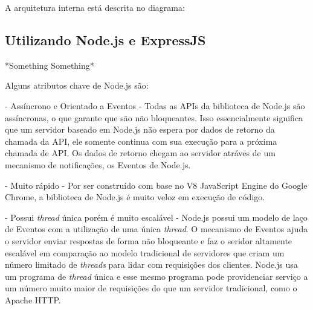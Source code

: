 \documentclass[a4paper,12pt]{article}
\begin{document}
A arquitetura interna está descrita no diagrama:





\subsection{Utilizando Node.js e ExpressJS}

*Something Something*

Alguns atributos chave de Node.js são:

- Assíncrono e Orientado a Eventos - Todas as APIs da biblioteca de Node.js são assíncronas, o que garante que são não bloqueantes. Isso essencialmente significa que um servidor baseado em Node.js não espera por dados de retorno da chamada da API, ele somente continua com sua execução para a próxima chamada de API. Os dados de retorno chegam ao servidor atráves de um mecanismo de notificações, os Eventos de Node.js. %


- Muito rápido - Por ser construído com base no V8 JavaScript Engine do Google Chrome, a biblioteca de Node.js é muito veloz em execução de código.

- Possui \emph{thread} única porém é muito escalável - Node.js possui um modelo de laço de Eventos com a utilização de uma única \emph{thread}. O mecanismo de Eventos ajuda o servidor enviar respostas de forma não bloqueante e faz o seridor altamente escalável em comparação ao modelo tradicional de servidores que criam um número limitado de \emph{threads} para lidar com requisições dos clientes. Node.js usa um programa de \emph{thread} única e esse mesmo programa pode providenciar serviço a um número muito maior de requisições do que um servidor tradicional, como o Apache HTTP.
\end{document}
